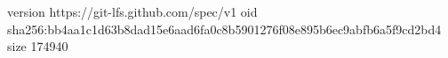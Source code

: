 version https://git-lfs.github.com/spec/v1
oid sha256:bb4aa1c1d63b8dad15e6aad6fa0c8b5901276f08e895b6ec9abfb6a5f9cd2bd4
size 174940
